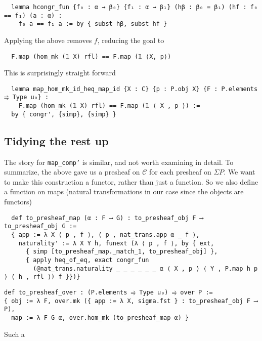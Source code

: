 \documentclass{article}
\newcommand{\CC}{\mathcal{C}}
\newcommand{\<}{\langle}
\renewcommand{\>}{\rangle}
\theoremstyle{definitionstyle}
\theoremstyle{exercisestyle}
\theoremstyle{remarkstyle}
\begin{document}
\begin{lstlisting}
  lemma hcongr_fun {f₀ : α → β₀} {f₁ : α → β₁} (hβ : β₀ = β₁) (hf : f₀ == f₁) (a : α) :
    f₀ a == f₁ a := by { subst hβ, subst hf } \end{lstlisting}

Applying the above removes $f$, reducing the goal to
\begin{lstlisting}
  F.map (hom_mk (𝟙 X) rfl) == F.map (𝟙 ⟨X, p⟩) \end{lstlisting}
This is surprisingly straight forward
\begin{lstlisting}
  lemma map_hom_mk_id_heq_map_id {X : C} {p : P.obj X} {F : P.elements ⥤ Type u₀} :
    F.map (hom_mk (𝟙 X) rfl) == F.map (𝟙 ⟨ X , p ⟩) :=
  by { congr', {simp}, {simp} } \end{lstlisting}

\subsection{Tidying the rest up}

The story for \texttt{map\_comp'} is similar, and not worth examining in detail.
To summarize,
the above gave us a presheaf on $\CC$ for each presheaf on $\Sigma P$.
We want to make this construction a functor, rather than just a function.
So we also define a function on maps (natural transformations in our case
since the objects are functors)

\begin{lstlisting}
  def to_presheaf_map (α : F ⟶ G) : to_presheaf_obj F ⟶ to_presheaf_obj G :=
  { app := λ X ⟨ p , f ⟩, ⟨ p , nat_trans.app α _ f ⟩,
    naturality' := λ X Y h, funext (λ ⟨ p , f ⟩, by { ext,
      { simp [to_presheaf_map._match_1, to_presheaf_obj] },
      { apply heq_of_eq, exact congr_fun
        (@nat_trans.naturality _ _ _ _ _ _ α ⟨ X , p ⟩ ⟨ Y , P.map h p ⟩ ⟨ h , rfl ⟩) f }})} \end{lstlisting}

\begin{lstlisting}
def to_presheaf_over : (P.elements ⥤ Type u₀) ⥤ over P :=
{ obj := λ F, over.mk ({ app := λ X, sigma.fst } : to_presheaf_obj F ⟶ P),
  map := λ F G α, over.hom_mk (to_presheaf_map α) } \end{lstlisting}

Such a

{}

\end{document}
